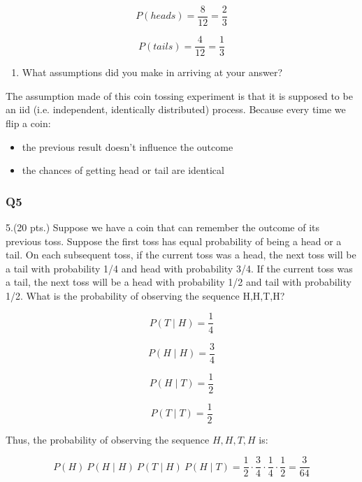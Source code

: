 \documentclass[11pt]{article}
\providecommand{\tightlist}{%
      \setlength{\itemsep}{0pt}\setlength{\parskip}{0pt}}
\begin{document}
    \[P(heads) = \frac{8}{12} = \frac{2}{3}\]

\[P(tails) = \frac{4}{12} = \frac{1}{3}\]

    \begin{enumerate}
\def\labelenumi{(\alph{enumi})}
\setcounter{enumi}{1}
\tightlist
\item
  What assumptions did you make in arriving at your answer?
\end{enumerate}

    The assumption made of this coin tossing experiment is that it is
supposed to be an iid (i.e. independent, identically distributed)
process. Because every time we flip a coin:

\begin{itemize}
\tightlist
\item
  the previous result doesn't influence the outcome
\item
  the chances of getting head or tail are identical
\end{itemize}

    \subsubsection*{Q5}\label{q5}

    5.(20 pts.) Suppose we have a coin that can remember the outcome of its
previous toss. Suppose the first toss has equal probability of being a
head or a tail. On each subsequent toss, if the current toss was a head,
the next toss will be a tail with probability 1/4 and head with
probability 3/4. If the current toss was a tail, the next toss will be a
head with probability 1/2 and tail with probability 1/2. What is the
probability of observing the sequence H,H,T,H?

    \[P(T \mid H) = \frac{1}{4}\]

\[P(H \mid H) = \frac{3}{4}\]

\[P(H \mid T) = \frac{1}{2}\]

\[P(T \mid T) = \frac{1}{2}\]

Thus, the probability of observing the sequence \(H,H,T,H\) is:

\[P(H) \: P(H \mid H) \: P(T \mid H) \: P(H \mid T) = \frac{1}{2} \cdot \frac{3}{4} \cdot \frac{1}{4} \cdot \frac{1}{2} = \frac{3}{64}\]


    
    
    
    
\end{document}
